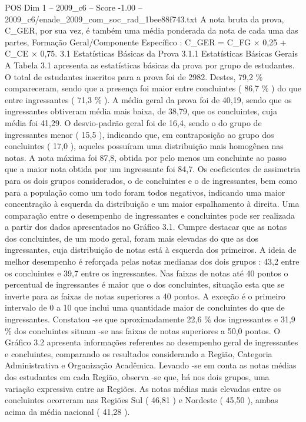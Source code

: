 \begin{textsample}{POS Dim 1 – 2009\_c6 – Score -1.00 – 2009\_c6/enade\_2009\_com\_soc\_rad\_1bee88f743.txt}
A nota bruta da prova, C\_GER, por sua vez, é também uma média ponderada da nota de cada uma das partes, Formação Geral/Componente Específico : C\_GER = C\_FG × 0,25 + C\_CE × 0,75. 3.1 Estatísticas Básicas da Prova 3.1.1 Estatísticas Básicas Gerais A Tabela 3.1 apresenta as estatísticas básicas da prova por grupo de estudantes.
O total de estudantes inscritos para a prova foi de 2982.
Destes, 79,2 \% compareceram, sendo que a presença foi maior entre concluintes ( 86,7 \% ) do que entre ingressantes ( 71,3 \% ).
A média geral da prova foi de 40,19, sendo que os ingressantes obtiveram média mais baixa, de 38,79, que os concluintes, cuja média foi 41,29.
O desvio-padrão geral foi de 16,4, sendo o do grupo de ingressantes menor ( 15,5 ), indicando que, em contraposição ao grupo dos concluintes ( 17,0 ), aqueles possuíram uma distribuição mais homogênea nas notas.
A nota máxima foi 87,8, obtida por pelo menos um concluinte ao passo que a maior nota obtida por um ingressante foi 84,7.
Os coeficientes de assimetria para os dois grupos considerados, o de concluintes e o de ingressantes, bem como para a população como um todo foram todos negativos, indicando uma maior concentração à esquerda da distribuição e um maior espalhamento à direita.
Uma comparação entre o desempenho de ingressantes e concluintes pode ser realizada a partir dos dados apresentados no Gráfico 3.1.
Cumpre destacar que as notas dos concluintes, de um modo geral, foram mais elevadas do que as dos ingressantes, cuja distribuição de notas está à esquerda dos primeiros.
A ideia de melhor desempenho é reforçada pelas notas medianas dos dois grupos : 43,2 entre os concluintes e 39,7 entre os ingressantes.
Nas faixas de notas até 40 pontos o percentual de ingressantes é maior que o dos concluintes, situação esta que se inverte para as faixas de notas superiores a 40 pontos.
A exceção é o primeiro intervalo de 0 a 10 que inclui uma quantidade maior de concluintes do que de ingressantes.
Constatou -se que aproximadamente 22,6 \% dos ingressantes e 31,9 \% dos concluintes situam -se nas faixas de notas superiores a 50,0 pontos.
O Gráfico 3.2 apresenta informações referentes ao desempenho geral de ingressantes e concluintes, comparando os resultados considerando a Região, Categoria Administrativa e Organização Acadêmica.
Levando -se em conta as notas médias dos estudantes em cada Região, observa -se que, há nos dois grupos, uma variação expressiva entre as Regiões.
As notas médias mais elevadas entre os concluintes ocorreram nas Regiões Sul ( 46,81 ) e Nordeste ( 45,50 ), ambas acima da média nacional ( 41,28 ).

\end{textsample}
